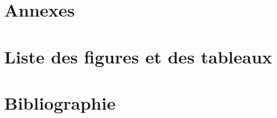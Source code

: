 \part{Annexes}
\part{Liste des figures et des tableaux}
\part{Bibliographie}
\nocite{*}
\printbibliography